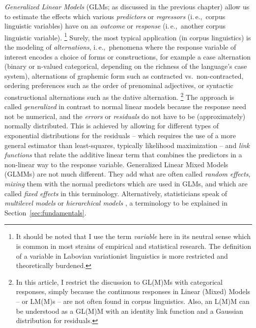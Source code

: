 \documentclass[a4paper,12pt]{article}
\newcommand{\ie}{i.\,e.,\ }
\begin{document}
\textit{Generalized Linear Models} (GLMs; as discussed in the previous chapter) allow us to estimate the effects which various \textit{predictors} or \textit{regressors} (\ie corpus linguistic variables) have on an \textit{outcome} or \textit{response} (\ie another corpus linguistic variable).%
\footnote{It should be noted that I use the term \textit{variable} here in its neutral sense which is common in most strains of empirical and statistical research.
The definition of a variable in Labovian variationist linguistics is more restricted and theoretically burdened.}
Surely, the most typical application (in corpus linguistics) is the modeling of \textit{alternations}, \ie phenomena where the response variable of interest encodes a choice of forms or constructions, for example a case alternation (binary or n-valued categorical, depending on the richness of the language's case system), alternations of graphemic form such as contracted vs.\ non-contracted, ordering preferences such as the order of prenominal adjectives, or syntactic constructional alternations such as the dative alternation.%
\footnote{In this article, I restrict the discussion to GL(M)Ms with categorical responses, simply because the continuous responses in Linear (Mixed) Models -- or LM(M)s – are not often found in corpus linguistics.
Also, an L(M)M can be understood as a GL(M)M with an identity link function and a Gaussian distribution for residuals.}
The approach is called \textit{generalized} in contrast to normal linear models because the response need not be numerical, and the \textit{errors} or \textit{residuals} do not have to be (approximately) normally distributed.
This is achieved by allowing for different types of exponential distributions for the residuals -- which requires the use of a more general estimator than least-squares, typically likelihood maximization -- and \textit{link functions} that relate the additive linear term that combines the predictors in a non-linear way to the response variable.
Generalized Linear Mixed Models (GLMMs) are not much different.
They add what are often called \textit{random effects}, \textit{mixing} them with the normal predictors which are used in GLMs, and which are called \textit{fixed effects} in this terminology.
Alternatively, statisticians speak of \textit{multilevel models} or \textit{hierarchical models} \citep{GelmanHill2006}, a terminology to be explained in Section~\ref{sec:fundamentals}.
\end{document}
